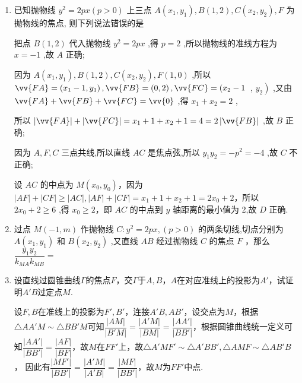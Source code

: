 \begin{enumerate}
\begin{jieda}
    \end{jieda}

    \item 已知抛物线 ${y}^{2} = {2px}\left( {p > 0}\right)$ 上三点 $A\left( {{x}_{1},{y}_{1}}\right) ,B\left( {1,2}\right) ,C\left( {{x}_{2},{y}_{2}}\right) ,F$ 为抛物线的焦点, 则下列说法错误的是
    \begin{jieda}
        把点 $B\left( {1,2}\right)$ 代入抛物线 ${y}^{2} = {2px}$ ,得 $p = 2$ ,所以抛物线的准线方程为 $x =  - 1$ ,故 ${A}$ 正确;
        
        因为 $A\left( {{x}_{1},{y}_{1}}\right) ,B\left( {1,2}\right) ,C\left( {{x}_{2},{y}_{2}}\right) ,F\left( {1,0}\right)$ ,所以 $\vv{FA} = \left( {{x}_{1} - 1,{y}_{1}}\right) ,\vv{FB} = \left( {0,2}\right) ,\vv{FC} = \left( {{x}_{2} - 1}\right.$ , $\left. {y}_{2}\right)$ ,又由 $\vv{FA} + \vv{FB} + \vv{FC} = \vv{0}$ ,得 ${x}_{1} + {x}_{2} = 2$ ,
        
        所以 $\left| \vv{FA}\right|  + \left| \vv{FC}\right|  = {x}_{1} + 1 + {x}_{2} + 1 = 4 = 2\left| \vv{FB}\right|$ ,故 ${B}$ 正确;
        
        因为 $A,F,C$ 三点共线,所以直线 ${AC}$ 是焦点弦,所以 ${y}_{1}{y}_{2} =  - {p}^{2} =  - 4$ ,故 ${C}$ 不正确; 
        
        
        设 ${AC}$ 的中点为 $M\left( {{x}_{0},{y}_{0}}\right)$，因为 $\left| {AF}\right|  + \left| {CF}\right|  \geq  \left| {AC}\right| ,\left| {AF}\right|  + \left| {CF}\right|  = {x}_{1} + 1 + {x}_{2} + 1 = 2{x}_{0} + 2$，所以 $2{x}_{0} + 2 \geq  6$ ,得 ${x}_{0} \geq  2$，即 ${AC}$ 的中点到 $y$ 轴距离的最小值为 2,故 ${D}$ 正确.
    \end{jieda}


        \item 过点 $M\left( {-1,m}\right)$ 作抛物线 $C : {y}^2 = {2px},\left( {p > 0}\right)$ 的两条切线,切点分别为 $A\left( {{x}_1,{y}_1}\right)$ 和 $B\left( {{x}_2,{y}_2}\right)$ ,又直线 ${AB}$ 经过抛物线 $C$ 的焦点 $F$ ，那么 $\dfrac{{y}_1{y}_2}{{k}_{MA}{k}_{MB}} =$ 
    \item 设直线过圆锥曲线$\Gamma$的焦点$F$，交$\Gamma$于$A, B$，$A$在对应准线上的投影为$A'$，试证明$A'B$过定点$M$.
    \begin{jieda}
        设$F, B$在准线上的投影为$F', B'$，连接$A'B, AB'$，设交点为$M$，根据$\triangle AA'M \sim \triangle BB'M$可知$\dfrac{|AM|}{|B'M|} = \dfrac{|A'M|}{|BM|} = \dfrac{|AA'|}{|BB'|}$，根据圆锥曲线统一定义可知$\dfrac{|AA'|}{|BB'|} = \dfrac{|AF|}{|BF|}$，故$M$在$FF'$上，故$\triangle A'MF' \sim \triangle A'BB', \triangle AMF \sim \triangle AB'B$， 因此有$\dfrac{|MF'|}{|BB'|} = \dfrac{|A'M|}{|A'B|} = \dfrac{|MF|}{|BB'|}$，故$M$为$FF'$中点.
    

\end{jieda}
\end{enumerate}
